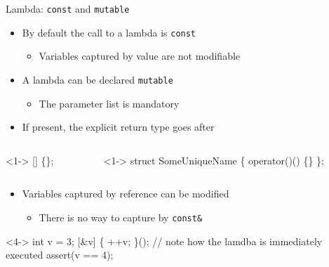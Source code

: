 \begin{frame}[fragile]{Lambda: \texttt{const} and \texttt{mutable}}
  \begin{itemize}
  \item By default the call to a lambda is \texttt{const}
    \begin{itemize}
    \item Variables captured by value are not modifiable
    \end{itemize}
  \item<2-> A lambda can be declared \texttt{mutable}
    \begin{itemize}
    \item The parameter list is mandatory
    \end{itemize}
  \item<3-> If present, the explicit return type goes after 
  \end{itemize}

  \begin{columns}[T]
    \begin{column}{.5\textwidth}
      \begin{codeblock}<1->{
[] \{\};}\end{codeblock}
    \end{column}

    \begin{column}{.5\textwidth}
      \begin{codeblock}<1->{
struct SomeUniqueName \{
   operator()() \{\}
\};}\end{codeblock}
    \end{column}
  \end{columns}

  \begin{itemize}
  \item<4-> Variables captured by reference can be modified
    \begin{itemize}
    \item There is no way to capture by \texttt{const\&}
    \end{itemize}
  \end{itemize}

  \begin{codeblock}<4->
int v = 3;
[\&v] \{ ++v; \}(); // note how the lamdba is immediately executed
assert(v == 4);\end{codeblock}

\end{frame}

